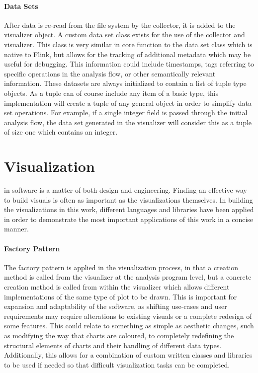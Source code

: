 \paragraph{Data Sets}
After data is re-read from the file system by the collector, it is added to the visualizer object. A custom data set class exists for the use of the collector and visualizer. This class is very similar in core function to the data set class which is native to Flink, but allows for the tracking of additional metadata which may be useful for debugging. This information could include timestamps, tags referring to specific operations in the analysis flow, or other semantically relevant information. These datasets are always initialized to contain a list of tuple type objects. As a tuple can of course include any item of a basic type, this implementation will create a tuple of any general object in order to simplify data set operations. For example, if a single integer field is passed through the initial analysis flow, the data set generated in the visualizer will consider this as a tuple of size one which contains an integer.



\section{Visualization}
\label{visualization}

 in software is a matter of both design and engineering. Finding an effective way to build visuals is often as important as the visualizations themselves. In building the visualizations in this work, different languages and libraries have been applied in order to demonstrate the most important applications of this work in a concise manner. 

\paragraph{Factory Pattern}
The factory pattern \cite{Gamma1995} is applied in the visualization process, in that a creation method is called from the visualizer at the analysis program level, but a concrete creation method is called from within the visualizer which allows different implementations of the same type of plot to be drawn. This is important for expansion and adaptability of the software, as shifting use-cases and user requirements may require alterations to existing visuals or a complete redesign of some features. This could relate to something as simple as aesthetic changes, such as modifying the way that charts are coloured, to completely redefining the structural elements of charts and their handling of different data types. Additionally, this allows for a combination of custom written classes and libraries to be used if needed so that difficult visualization tasks can be completed.

